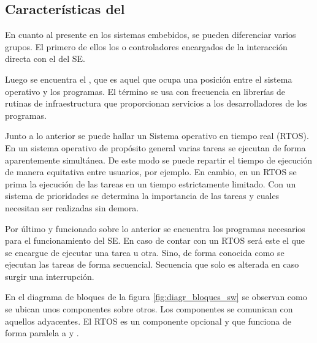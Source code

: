 \subsection{Características del }
En cuanto al  presente en los sistemas embebidos, se
pueden diferenciar varios grupos. El primero de ellos los
 o controladores encargados de la interacción directa
con el  del SE.

Luego se encuentra el , que es aquel
 que ocupa una posición entre el sistema operativo y los
programas. El término se usa con frecuencia en librerías de rutinas de
infraestructura que proporcionan servicios a los desarrolladores de los
programas. \cite{butt16}

Junto a lo anterior se puede hallar un Sistema operativo en tiempo real (RTOS).
En un sistema operativo de propósito general varias tareas se ejecutan de forma
aparentemente simultánea. De este modo se puede repartir el tiempo de ejecución
de manera equitativa entre usuarios, por ejemplo. En cambio, en un RTOS se prima
la ejecución de las tareas en un tiempo estrictamente limitado. Con un sistema
de prioridades se determina la importancia de las tareas y cuales necesitan ser
realizadas sin demora. \cite{amaz19}

Por último y funcionado sobre lo anterior se encuentra los programas necesarios
para el funcionamiento del SE. En caso de contar con un RTOS será este el que se
encargue de ejecutar una tarea u otra. Sino, de forma conocida como
 se ejecutan las tareas de forma secuencial. Secuencia
que solo es alterada en caso surgir una interrupción.

En el diagrama de bloques de la figura \ref{fig:diagr_bloques_sw} se observan
como se ubican unos componentes sobre otros. Los componentes se comunican con
aquellos adyacentes. El RTOS es un componente opcional y que funciona de forma
paralela a  y .
